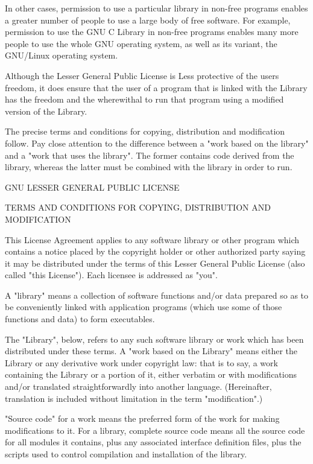 In other cases, permission to use a particular library in non-\/free programs enables a greater number of people to use a large body of free software. For example, permission to use the GNU C Library in non-\/free programs enables many more people to use the whole GNU operating system, as well as its variant, the GNU/\+Linux operating system.

Although the Lesser General Public License is Less protective of the users\textquotesingle{} freedom, it does ensure that the user of a program that is linked with the Library has the freedom and the wherewithal to run that program using a modified version of the Library.

The precise terms and conditions for copying, distribution and modification follow. Pay close attention to the difference between a "{}work based on the library"{} and a "{}work that uses the library"{}. The former contains code derived from the library, whereas the latter must be combined with the library in order to run. \begin{DoxyVerb}              GNU LESSER GENERAL PUBLIC LICENSE
\end{DoxyVerb}
 TERMS AND CONDITIONS FOR COPYING, DISTRIBUTION AND MODIFICATION


\begin{DoxyEnumerate}
\item This License Agreement applies to any software library or other program which contains a notice placed by the copyright holder or other authorized party saying it may be distributed under the terms of this Lesser General Public License (also called "{}this License"{}). Each licensee is addressed as "{}you"{}.
\end{DoxyEnumerate}

A "{}library"{} means a collection of software functions and/or data prepared so as to be conveniently linked with application programs (which use some of those functions and data) to form executables.

The "{}\+Library"{}, below, refers to any such software library or work which has been distributed under these terms. A "{}work based on the \+Library"{} means either the Library or any derivative work under copyright law\+: that is to say, a work containing the Library or a portion of it, either verbatim or with modifications and/or translated straightforwardly into another language. (Hereinafter, translation is included without limitation in the term "{}modification"{}.)

"{}\+Source code"{} for a work means the preferred form of the work for making modifications to it. For a library, complete source code means all the source code for all modules it contains, plus any associated interface definition files, plus the scripts used to control compilation and installation of the library.

